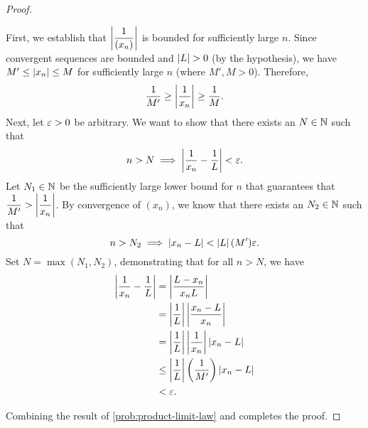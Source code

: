 \begin{problem}
\begin{enumerate}[label=(\alph*)]
\begin{proof}
          \begin{subproof}
            First, we establish that $\left\lvert \dfrac{1}{(x_{n})} \right\rvert$ is bounded for
            sufficiently large $n$. Since convergent\footnotemark{} sequences are
            bounded and $\left\lvert L \right\rvert > 0$ (by the hypothesis), we have $M' \leq \left\lvert x_{n} \right\rvert \leq M$
            for sufficiently large $n$ (where $M', M > 0$). Therefore, 
            \[
              \dfrac{1}{M'} \geq \left\lvert \dfrac{1}{x_{n}} \right\rvert \geq \dfrac{1}{M}.
            \]
            Next, let $\varepsilon > 0$ be arbitrary. We want to show that there exists
            an $N \in \mathbb{N}$ such that
            \begin{align*}
              n > N \implies \left\lvert \frac{1}{x_{n}} - \frac{1}{L} \right\rvert < \varepsilon.
            \end{align*}
            Let $N_{1} \in \mathbb{N}$ be the sufficiently large lower bound for $n$ that guarantees that
            $\dfrac{1}{M'} > \left\lvert \dfrac{1}{x_{n}} \right\rvert$. By convergence of
            $(x_{n})$, we know that there exists an $N_{2} \in \mathbb{N}$ such that
            \[
              n > N_{2} \implies \left\lvert x_{n} - L \right\rvert < \left\lvert L \right\rvert (M') \varepsilon.
            \]
            Set $N = \max(N_{1}, N_{2})$, demonstrating that for all $n > N$, we have
            \begin{align*}
              \left\lvert \dfrac{1}{x_{n}} - \dfrac{1}{L} \right\rvert &= \left\lvert \dfrac{L - x_{n}}{x_{n}L} \right\rvert \\
                                                    &= \left\lvert \dfrac{1}{L} \right\rvert \left\lvert \dfrac{x_{n} - L}{x_{n}} \right\rvert \\
                                                    &= \left\lvert \dfrac{1}{L} \right\rvert \left\lvert \dfrac{1}{x_{n}} \right\rvert \left\lvert x_{n} - L \right\rvert \\
                                                    &\leq \left\lvert \dfrac{1}{L} \right\rvert \left( \dfrac{1}{M'} \right) \left\lvert x_{n} - L \right\rvert \\
                                                    &< \varepsilon.
            \end{align*}
          \end{subproof}

          Combining the result of \ref{prob:product-limit-law} and
           completes the proof.
        \end{proof}

    \end{enumerate}
\end{problem}

